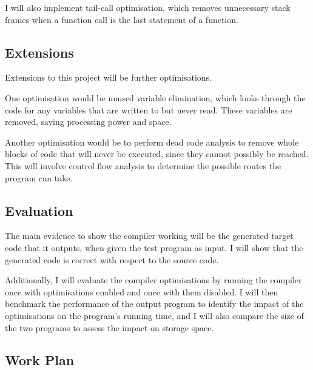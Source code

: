 I will also implement tail-call optimisation, which removes unnecessary stack frames when a function call is the last statement of a function.

\subsection*{Extensions}

Extensions to this project will be further optimisations.

One optimisation would be unused variable elimination, which looks through the code for any variables that are written to but never read. These variables are removed, saving processing power and space.

Another optimisation would be to perform dead code analysis to remove whole blocks of code that will never be executed, since they cannot possibly be reached. This will involve control flow analysis to determine the possible routes the program can take.


\subsection*{Evaluation}

The main evidence to show the compiler working will be the generated target code that it outputs, when given the test program as input. I will show that the generated code is correct with respect to the source code.

Additionally, I will evaluate the compiler optimisations by running the compiler once with optimisations enabled and once with them disabled. I will then benchmark the performance of the output program to identify the impact of the optimisations on the program's running time, and I will also compare the size of the two programs to assess the impact on storage space.

\subsection*{Work Plan}

